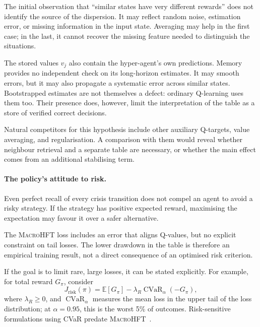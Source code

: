 \documentclass[9pt,a4paper,twocolumn]{extarticle}
\newcommand{\Macro}{\textsc{MacroHFT}}
\begin{document}
The initial observation that ``similar states have very different rewards'' does not identify the
source of the dispersion. It may reflect random noise, estimation error, or missing information
in the input state. Averaging may help in the first case; in the last, it cannot recover the
missing feature needed to distinguish the situations.

The stored values $v_j$ also contain the hyper-agent's own predictions. Memory provides no
independent check on its long-horizon estimates. It may smooth errors, but it may also propagate
a systematic error across similar states. Bootstrapped estimates are not themselves a defect:
ordinary Q-learning uses them too. Their presence does, however, limit the interpretation of the
table as a store of verified correct decisions.

Natural competitors for this hypothesis include other auxiliary Q-targets, value averaging, and
regularisation. A comparison with them would reveal whether neighbour retrieval and a separate
table are necessary, or whether the main effect comes from an additional stabilising term.

\paragraph{The policy's attitude to risk.}

Even perfect recall of every crisis transition does not compel an agent to avoid a risky
strategy. If the strategy has positive expected reward, maximising the expectation may favour it
over a safer alternative.

The \Macro{} loss includes an error that aligns Q-values, but no explicit constraint on tail
losses. The lower drawdown in the table is therefore an empirical training result, not a direct
consequence of an optimised risk criterion.

If the goal is to limit rare, large losses, it can be stated explicitly. For example, for total
reward $G_\pi$, consider
\begin{equation}
  J_{\mathrm{risk}}(\pi)
  =
  \mathbb E[G_\pi]
  -
  \lambda_R
  \operatorname{CVaR}_{\alpha}(-G_\pi),
  \label{eq:memory_risk_alternative}
\end{equation}
where $\lambda_R\geq0$, and $\operatorname{CVaR}_{\alpha}$ measures the mean loss in the upper
tail of the loss distribution; at $\alpha=0.95$, this is the worst 5\% of outcomes. Risk-sensitive
formulations using CVaR predate \Macro{}~\cite{chow2015cvar}.
\end{document}
